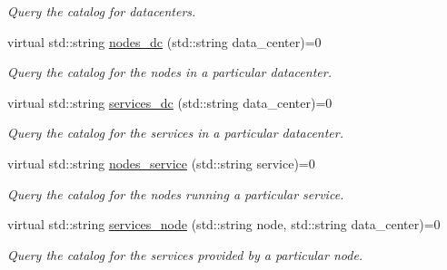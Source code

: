 \begin{DoxyCompactItemize}
\begin{DoxyCompactList}\small\item\em Query the catalog for datacenters. \end{DoxyCompactList}\item 
\hypertarget{classConsulInterface_a0831246af1b80ce5bbe074a47333c615}{virtual std\-::string \hyperlink{classConsulInterface_a0831246af1b80ce5bbe074a47333c615}{nodes\-\_\-dc} (std\-::string data\-\_\-center)=0}\label{classConsulInterface_a0831246af1b80ce5bbe074a47333c615}

\begin{DoxyCompactList}\small\item\em Query the catalog for the nodes in a particular datacenter. \end{DoxyCompactList}\item 
\hypertarget{classConsulInterface_ab1c3f2169a8aebdb5a66cfe8211330dc}{virtual std\-::string \hyperlink{classConsulInterface_ab1c3f2169a8aebdb5a66cfe8211330dc}{services\-\_\-dc} (std\-::string data\-\_\-center)=0}\label{classConsulInterface_ab1c3f2169a8aebdb5a66cfe8211330dc}

\begin{DoxyCompactList}\small\item\em Query the catalog for the services in a particular datacenter. \end{DoxyCompactList}\item 
\hypertarget{classConsulInterface_a7490a960b2e10855c7d7ff09d87942b8}{virtual std\-::string \hyperlink{classConsulInterface_a7490a960b2e10855c7d7ff09d87942b8}{nodes\-\_\-service} (std\-::string service)=0}\label{classConsulInterface_a7490a960b2e10855c7d7ff09d87942b8}

\begin{DoxyCompactList}\small\item\em Query the catalog for the nodes running a particular service. \end{DoxyCompactList}\item 
\hypertarget{classConsulInterface_abbd5b2839d3548d48e93074a53844f40}{virtual std\-::string \hyperlink{classConsulInterface_abbd5b2839d3548d48e93074a53844f40}{services\-\_\-node} (std\-::string node, std\-::string data\-\_\-center)=0}\label{classConsulInterface_abbd5b2839d3548d48e93074a53844f40}

\begin{DoxyCompactList}\small\item\em Query the catalog for the services provided by a particular node. \end{DoxyCompactList}\end{DoxyCompactItemize}


